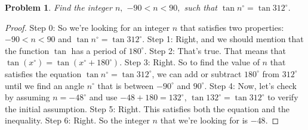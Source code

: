 \documentclass{article}
\newtheorem{theorem}{Problem}
\begin{document}
\begin{theorem}
Find the integer $n,$ $-90 < n < 90,$ such that $\tan n^\circ = \tan 312^\circ.$
\end{theorem}

\begin{proof}
Step 0: So we're looking for an integer $n$ that satisfies two properties: $-90 < n < 90$ and $\tan n^\circ = \tan 312^\circ$.
Step 1: Right, and we should mention that the function $\tan$ has a period of $180^\circ$.
Step 2: That's true. That means that $\tan (x^\circ) = \tan (x^\circ + 180^\circ)$.
Step 3: Right. So to find the value of $n$ that satisfies the equation $\tan n^\circ = \tan 312^\circ$, we can add or subtract $180^\circ$ from $312^\circ$ until we find an angle $n^\circ$ that is between $-90^\circ$ and $90^\circ$.
Step 4: Now, let’s check by assuming $n = -48^\circ$ and use $-48+180 = 132^\circ$, $\tan 132^\circ = \tan 312^\circ$ to verify the initial assumption.
Step 5: Right. This satisfies both the equation and the inequality.
Step 6: Right. So the integer $n$ that we're looking for is $-48$.
\end{proof}
\end{document}
